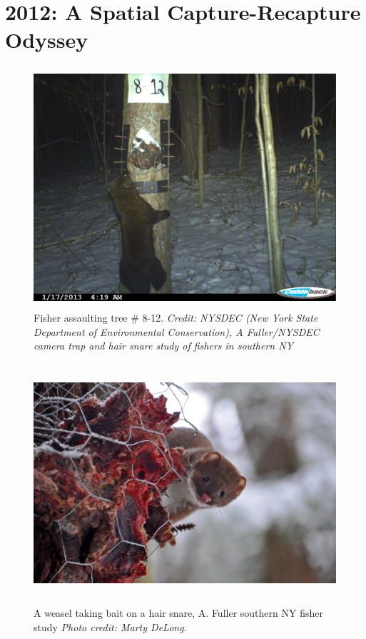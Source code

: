 \chapter{
2012: A Spatial Capture-Recapture Odyssey
}

\label{chapt.final}

\vspace{0.3cm}






\begin{figure}[h!]
\centering
\includegraphics[height=3.5in]{Ch20-Last/fisher.jpg}
\caption{
Fisher assaulting tree \# 8-12.
{\it Credit: NYSDEC (New York State Department of Environmental Conservation),
A Fuller/NYSDEC camera trap and hair snare study of fishers in
southern NY}
}
\label{last.fig.fisher}
\end{figure}

\begin{figure}[h!]
\centering
\includegraphics[height=3.5in]{Ch20-Last/weasel.jpg}
\caption{
A weasel taking bait on a hair snare, A. Fuller southern NY fisher study
{\it Photo credit: Marty DeLong}.
}
\label{last.fig.weasels}
\end{figure}



